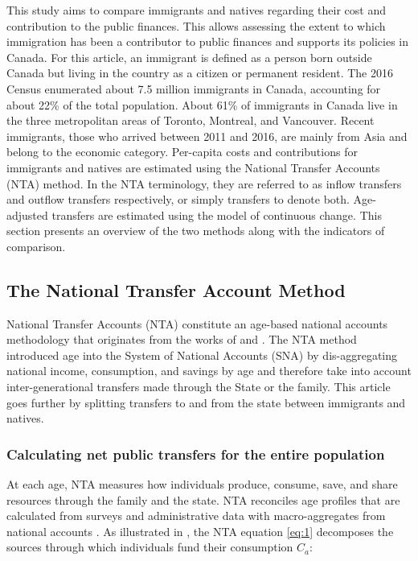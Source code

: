 This study aims to compare immigrants and natives regarding their cost and contribution to the public finances.
This allows assessing the extent to which immigration has been a contributor to public finances and supports its policies in Canada.
For this article, an immigrant is defined as a person born outside Canada but living in the country as a citizen or permanent resident.
The 2016 Census enumerated about 7.5 million immigrants in Canada, accounting for about 22\% of the total population.
About 61\% of immigrants in Canada live in the three metropolitan areas of Toronto, Montreal, and Vancouver.
Recent immigrants, those who arrived between 2011 and 2016, are mainly from Asia and belong to the economic category.
Per-capita costs and contributions for immigrants and natives are estimated using the National Transfer Accounts (NTA) method.
In the NTA terminology, they are referred to as inflow transfers and outflow transfers respectively, or simply transfers to denote both.
Age-adjusted transfers are estimated using the model of continuous change.
This section presents an overview of the two methods along with the indicators of comparison.

\subsection{The National Transfer Account Method}\label{sec:nta}
National Transfer Accounts (NTA) constitute an age-based national accounts methodology that originates from the works of \citet{Lee:1980ci} and \citet{Mason:1988fz}.
The NTA method introduced age into the System of National Accounts (SNA) by dis-aggregating national income, consumption, and savings by age and therefore take into account inter-generational transfers made through the State or the family.
This article goes further by splitting transfers to and from the state between immigrants and natives.

\subsubsection*{Calculating net public transfers for the entire population}
At each age, NTA measures how individuals produce, consume, save, and share resources through the family and the state.
NTA reconciles age profiles that are calculated from surveys and administrative data with macro-aggregates from national accounts \citep{UnitedNations:2013vz}.
As illustrated in \citet{dAlbis:2019de}, the NTA equation \eqref{eq:1} decomposes the sources through which individuals fund their consumption \(C_a\):


